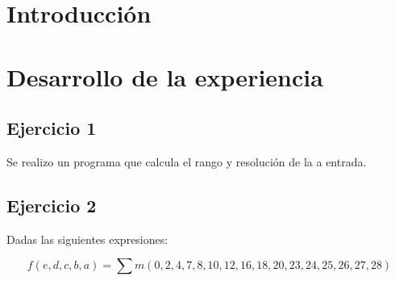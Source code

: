 \documentclass[a4paper]{article}
\begin{document}




\section*{Introducción}


\section*{Desarrollo de la experiencia}

\subsection*{Ejercicio 1}
Se realizo un programa que calcula el rango y resolución de la a entrada.
\subsection*{Ejercicio 2}

Dadas las siguientes expresiones:

\begin{equation}
f \left( e,d,c,b,a \right) = \sum m \left( 0,2,4,7,8,10,12,16,18,20,23,24,25,26,27,28 \right)
\label{equ:minterms}
\end{equation}
\end{document}
